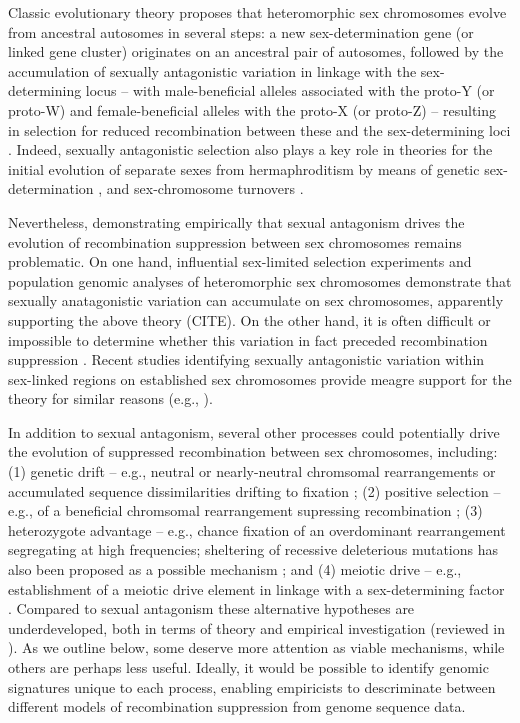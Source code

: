 \documentclass{article}
\begin{document}
Classic evolutionary theory proposes that heteromorphic sex chromosomes evolve from ancestral autosomes in several steps: a new sex-determination gene (or linked gene cluster) originates on an ancestral pair of autosomes, followed by the accumulation of sexually antagonistic variation in linkage with the sex-determining locus -- with male-beneficial alleles associated with the proto-Y (or proto-W) and female-beneficial alleles with the proto-X (or proto-Z) -- resulting in selection for reduced recombination between these and the sex-determining loci \citep{Fisher1931, Nei1969, Charlesworth1980, Bull1983, Rice1987, Lenormand2003}. Indeed, sexually antagonistic selection also plays a key role in theories for the initial evolution of separate sexes from hermaphroditism by means of genetic sex-determination \citep{Charlesworth1978a, Charlesworth1978b, Bull1983, Olito2019}, and sex-chromosome turnovers \citep{vanDoornKirkpatrick2007,vanDoornKirkpatrick2010,OttoScottOsmond2018}. 

Nevertheless, demonstrating empirically that sexual antagonism drives the evolution of recombination suppression between sex chromosomes remains problematic. On one hand, influential sex-limited selection experiments and population genomic analyses of heteromorphic sex chromosomes demonstrate that sexually anatagonistic variation can accumulate on sex chromosomes, apparently supporting the above theory (CITE). On the other hand, it is often difficult or impossible to determine whether this variation in fact preceded recombination suppression \citep{Charlesworth1980, Rice1984, Ironside2010, Ponnikas2018}. Recent studies identifying sexually antagonistic variation within sex-linked regions on established sex chromosomes provide meagre support for the theory for similar reasons (e.g., \citealt{BergeroCharlesworth2009, Wright2017,Bergero2019}).

In addition to sexual antagonism, several other processes could potentially drive the evolution of suppressed recombination between sex chromosomes, including: (1) genetic drift -- e.g., neutral or nearly-neutral chromsomal rearrangements or accumulated sequence dissimilarities drifting to fixation \citep{CharlesworthMarais2005}; (2) positive selection -- e.g., of a beneficial chromsomal rearrangement supressing recombination \citep{Haldane1957}; (3) heterozygote advantage -- e.g., chance fixation of an overdominant rearrangement segregating at high frequencies; sheltering of recessive deleterious mutations has also been proposed as a possible mechanism \citep{Ironside2010,Branco2017, Ponnikas2018}; and (4) meiotic drive -- e.g., establishment of a meiotic drive element in linkage with a sex-determining factor \citep{UbedaPatten2010}. Compared to sexual antagonism these alternative hypotheses are underdeveloped, both in terms of theory and empirical investigation (reviewed in \citealt{Ironside2010, Ponnikas2018}). As we outline below, some deserve more attention as viable mechanisms, while others are perhaps less useful. Ideally, it would be possible to identify genomic signatures unique to each process, enabling empiricists to descriminate between different models of recombination suppression from genome sequence data. 
\end{document}

